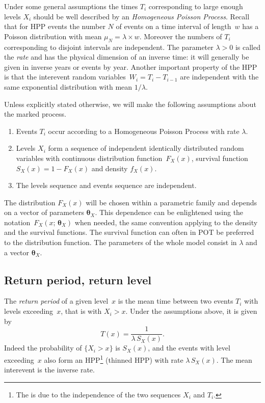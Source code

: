 \documentclass[a4paper]{report}
\newcommand{\bs}{\boldsymbol}
\begin{document}
Under some general assumptions the times $T_i$ corresponding to
large enough levels $X_i$ should be well described by an
\textit{Homogeneous Poisson Process}.  Recall that for HPP events the
number $N$ of events on a time interval of length~$w$ has a Poisson
distribution with mean $\mu_N=\lambda \times w$. Moreover the numbers
of $T_i$ corresponding to disjoint intervals are independent.  The
parameter $\lambda>0$ is called the \textit{rate} 
 and has the physical dimension of an inverse time: it will
generally be given in inverse years or events by year. Another
important property of the HPP is that the interevent random
variables~$W_i=T_i-T_{i-1}$ are independent with the same exponential
distribution with mean $1/\lambda$.  


Unless explicitly stated otherwise, we will make the following
assumptions about the marked process.
\begin{enumerate}
\item Events $T_i$ occur according to a Homogeneous Poisson Process
  with rate $\lambda$.
\item Levels $X_i$ form a sequence of independent identically
  distributed random variables with continuous distribution
  function~$F_X(x)$, survival function $S_X(x)= 1-F_X(x)$ and density
  $f_X(x)$.
\item The levels sequence and events sequence are independent.
\end{enumerate}
The distribution $F_X(x)$ will be chosen within a parametric family
and depends on a vector of parameters $\bs{\theta}_X$. This dependence
can be enlightened using the notation~$F_X(x;\,\bs{\theta}_X)$ when
needed, the same convention applying to the density and the survival
functions.  The survival function can often in POT be preferred to the
distribution function.  The parameters of the whole model consist in
$\lambda$ and a vector $\bs{\theta}_X$.


\subsection{Return period, return level}
\label{RETPERLEV}
The \textit{return period}  
of a given level~$x$
is the mean time between two events $T_i$ with levels exceeding~$x$,
that is with $X_i > x$. Under the assumptions above, it is given by
\begin{equation}
  \label{eq:RETPER}
  T(x) = \frac{1}{\lambda \,S_X(x)}.
\end{equation}
Indeed the probability of $\{X_i>x\}$ is $S_X(x)$, and the events
with level exceeding~$x$ also form an HPP\footnote{The is due to the
  independence of the two sequences $X_i$ and $T_i$.}  (thinned HPP)
with rate $\lambda \,S_X(x) $.  
%
The mean interevent is the inverse rate.
\end{document}
